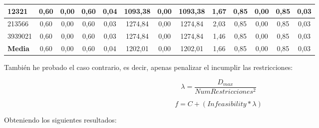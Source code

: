 \documentclass[12pt, spanish]{article}
\begin{document}
\begin{table}[H]
\begin{adjustwidth}{-1.2cm}{-1.2cm}
\begin{tabular}{|l|c|c|c|c|c|c|c|c|c|c|c|c|}
12321                                                   & 0,60                         & 0,00                           & 0,60                      & 0,04                   & 1093,38                      & 0,00                           & 1093,38                   & 1,67                   & 0,85                         & 0,00                           & 0,85                      & 0,03                   \\ \hline
213566                                                  & 0,60                         & 0,00                           & 0,60                      & 0,03                   & 1274,84                      & 0,00                           & 1274,84                   & 2,03                   & 0,85                         & 0,00                           & 0,85                      & 0,03                   \\ \hline
3939021                                                 & 0,60                         & 0,00                           & 0,60                      & 0,03                   & 1274,84                      & 0,00                           & 1274,84                   & 1,46                   & 0,85                         & 0,00                           & 0,85                      & 0,03                   \\ \hline
\textbf{Media}                                          & 0,60                         & 0,00                           & 0,60                      & 0,04                   & 1202,01                      & 0,00                           & 1202,01                   & 1,66                   & 0,85                         & 0,00                           & 0,85                      & 0,03                   \\ \hline
\end{tabular}
\end{adjustwidth}

\end{table}

\newpage

También he probado el caso contrario, es decir, apenas penalizar el incumplir las restricciones: 

$$ \lambda = \frac{D_{max}}{NumRestricciones^2} $$ 

$$ f = C + (\textit{Infeasibility} * \lambda) $$ 

Obteniendo los siguientes resultados:
\end{document}
